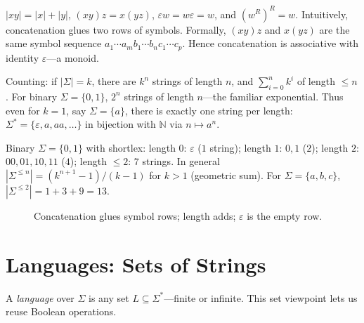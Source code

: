 \begin{example}
$|xy|=|x|+|y|$, $(xy)z=x(yz)$, $\varepsilon w=w\varepsilon=w$, and $(w^R)^R=w$. Intuitively, concatenation glues two rows of symbols. Formally, $(xy)z$ and $x(yz)$ are the same symbol sequence $a_1\cdots a_m b_1\cdots b_n c_1\cdots c_p$. Hence concatenation is associative with identity $\varepsilon$---a monoid.
\end{example}

Counting: if $|\Sigma|=k$, there are $k^n$ strings of length $n$, and $\sum_{i=0}^{n}k^i$ of length $\le n$. For binary $\Sigma=\{0,1\}$, $2^n$ strings of length $n$---the familiar exponential. Thus even for $k=1$, say $\Sigma=\{a\}$, there is exactly one string per length: $\Sigma^*=\{\varepsilon,a,aa,\dots\}$ in bijection with $\mathbb{N}$ via $n\mapsto a^n$.
\begin{example}
Binary $\Sigma=\{0,1\}$ with shortlex: length $0$: $\varepsilon$ ($1$ string); length $1$: $0,1$ ($2$); length $2$: $00,01,10,11$ ($4$); length $\le2$: $7$ strings. In general $|\Sigma^{\le n}|=(k^{n+1}-1)/(k-1)$ for $k>1$ (geometric sum).
For $\Sigma=\{a,b,c\}$, $|\Sigma^{\le2}|=1+3+9=13$.
\end{example}

\begin{figure}[h]
\centering
{}
\caption{Concatenation glues symbol rows; length adds; $\varepsilon$ is the empty row.}
\label{fig:concat-bar}
\end{figure}

\section{Languages: Sets of Strings}
\label{sec:languages}
A \emph{language} over $\Sigma$ is any set $L\subseteq\Sigma^*$---finite or infinite. This set viewpoint lets us reuse Boolean operations.

